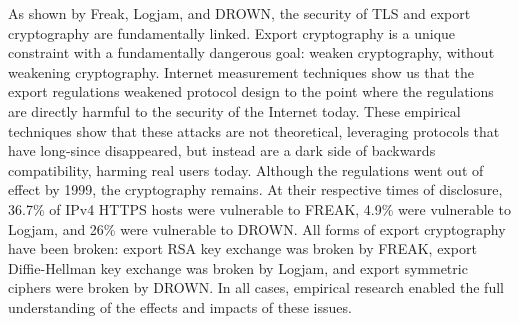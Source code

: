 As shown by Freak, Logjam, and DROWN, the security of TLS and export
cryptography are fundamentally linked. Export cryptography is a unique
constraint with a fundamentally dangerous goal: weaken cryptography, without
weakening cryptography. Internet measurement techniques show us that the export
regulations weakened protocol design to the point where the regulations are
directly harmful to the security of the Internet today. These empirical
techniques show that these attacks are not theoretical, leveraging protocols
that have long-since disappeared, but instead are a dark side of backwards
compatibility, harming real users today. Although the regulations went out of
effect by 1999, the cryptography remains. At their respective times of
disclosure, 36.7\% of IPv4 HTTPS hosts were vulnerable to FREAK, 4.9\% were
vulnerable to Logjam, and 26\% were vulnerable to DROWN. All forms of export
cryptography have been broken: export RSA key exchange was broken by FREAK,
export Diffie-Hellman key exchange was broken by Logjam, and export symmetric
ciphers were broken by DROWN. In all cases, empirical research enabled the full
understanding of the effects and impacts of these issues.

% 
% 

